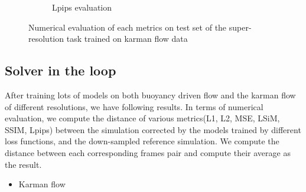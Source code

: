 \documentclass[a4paper,12pt,twoside]{report}
\begin{document}
\begin{figure}
\begin{subfigure}{0.32\textwidth}
		\caption{Lpips evaluation}
	\end{subfigure}
	\caption{Numerical evaluation of each metrics on test set of the super-resolution task trained on karman flow data}
\end{figure}

\subsection{Solver in the loop}
After training lots of models on both buoyancy driven flow and the karman flow of different resolutions, we have following results. In terms of numerical evaluation, we compute the distance of various metrics(L1, L2, MSE, LSiM, SSIM, Lpips) between the simulation corrected by the models trained by different loss functions, and the down-sampled reference simulation. We compute the distance between each corresponding frames pair and compute their average as the result.
\begin{itemize}
  \item Karman flow
\end{itemize}
\end{document}
